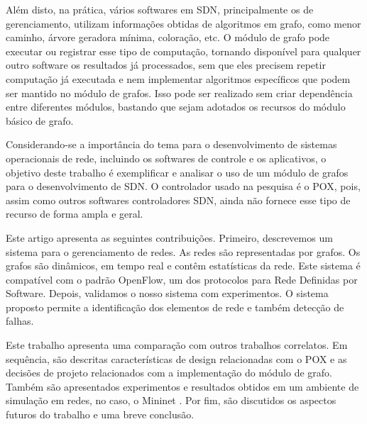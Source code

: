 Além disto, na prática, vários softwares em SDN,
principalmente os de gerenciamento, utilizam informações
obtidas de algoritmos em grafo, como menor caminho,
árvore geradora mínima, coloração, etc.
O módulo de grafo pode executar ou registrar esse tipo de computação,
tornando disponível para qualquer outro software os resultados já processados,
sem que eles precisem repetir computação já executada e nem 
implementar algoritmos específicos que podem ser mantido no módulo de grafos.
Isso pode ser realizado sem criar dependência entre diferentes módulos,
bastando que sejam adotados os recursos do módulo básico de grafo.

Considerando-se a importância do tema para o desenvolvimento de 
sistemas operacionais de rede, 
incluindo os softwares de controle e os aplicativos,
o objetivo deste trabalho é exemplificar e analisar o uso de um módulo de grafos 
para o desenvolvimento de SDN.
O controlador usado na pesquisa é o POX,
pois, assim como outros softwares controladores SDN,
ainda não fornece esse tipo de recurso de forma ampla e geral.

Este artigo apresenta as seguintes contribuições. 
Primeiro, descrevemos um sistema para o gerenciamento de redes. 
As redes são representadas por grafos. 
Os grafos são dinâmicos, em tempo real e contêm estatísticas da rede. 
Este sistema é compatível com o padrão OpenFlow, um dos protocolos para Rede Definidas por Software. 
Depois, validamos o nosso sistema com experimentos. 
O sistema proposto permite a identificação dos elementos de rede e também detecção de falhas.

Este trabalho apresenta uma comparação com outros trabalhos correlatos. 
Em sequência, são descritas características de design relacionadas com o POX 
e as decisões de projeto relacionados com a implementação do módulo de grafo. 
Também são apresentados experimentos e resultados 
obtidos em um ambiente de simulação em redes, 
no caso, o Mininet \citep{lantz2010network}.
Por fim, são discutidos os aspectos futuros do trabalho e uma breve conclusão. 
